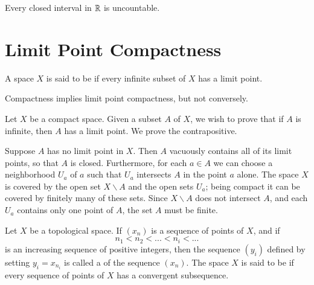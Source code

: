 \documentclass[12pt, a4paper, twoside, openright, titlepage]{book}
\begin{document}
\begin{cor}{}{}
    Every closed interval in $\mathbb R$ is uncountable.
\end{cor}


\section{Limit Point Compactness}

\begin{defn}{}{}
    A space $X$ is said to be  if every infinite subset of $X$ has a limit point.
\end{defn}

\begin{thm}{}{}
    Compactness implies limit point compactness, but not conversely.
\end{thm}
\begin{proof*}{}{}
    Let $X$ be a compact space. Given a subset $A$ of $X$, we wish to prove that if $A$ is infinite, then $A$ has a limit point. We prove the contrapositive.

    Suppose $A$ has no limit point in $X$. Then $A$ vacuously contains all of its limit points, so that $A$ is closed. Furthermore, for each $a \in A$ we can choose a neighborhood $U_a$ of $a$ such that $U_a$ intersects $A$ in the point $a$ alone. The space $X$ is covered by the open set $X\backslash A$ and the open sets $U_a$; being compact it can be covered by finitely many of these sets. Since $X\backslash A$ does not intersect $A$, and each $U_a$ contains only one point of $A$, the set $A$ must be finite.
\end{proof*}


\begin{defn}{}{}
    Let $X$ be a topological space. If $(x_n)$ is a sequence of points of $X$, and if \begin{equation*}
        n_1 < n_2 < ... < n_i < ...
    \end{equation*}
    is an increasing sequence of positive integers, then the sequence $(y_i)$ defined by setting $y_i = x_{n_i}$ is called a  of the sequence $(x_n)$. The space $X$ is said to be  if every sequence of points of $X$ has a convergent subsequence.
\end{defn}
\end{document}
